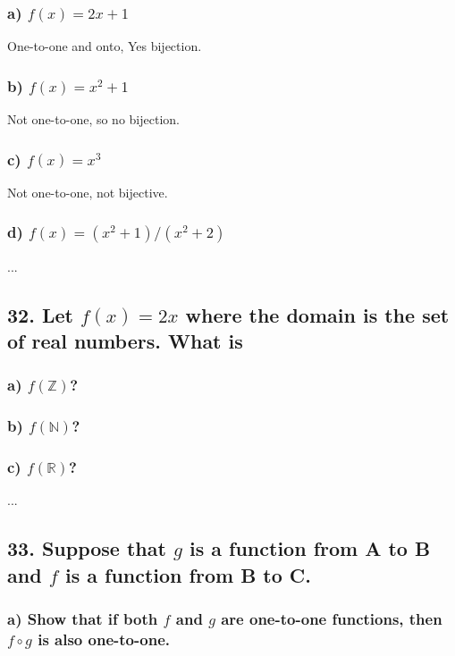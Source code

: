 \documentclass[11pt, oneside]{article} %
\numberwithin{equation}{section} %
\numberwithin{figure}{section} %
\numberwithin{table}{section} %
\begin{document}
\subsubsection{a) $f(x)=2x+1$}
One-to-one and onto, Yes bijection.
\subsubsection{b) $f(x)=x^2+1$}
Not one-to-one, so no bijection.
\subsubsection{c) $f(x)=x^3$}
Not one-to-one, not bijective.
\subsubsection{d) $f(x)=(x^2 +1)/(x^2 +2)$}
...

\subsection{32. Let $f(x) = 2x$ where the domain is the set of real numbers. What is}
\subsubsection{a) $f(\mathbb{Z})$?}
\subsubsection{b) $f(\mathbb{N})$?}
\subsubsection{c) $f(\mathbb{R})$?}
...


\subsection{33. Suppose that $g$ is a function from A to B and $f$ is a function from B to C.}
\subsubsection{a) Show that if both $f$ and $g$ are one-to-one functions, then $f\circ g$ is also one-to-one.}
\end{document}
